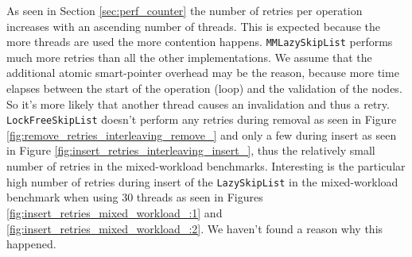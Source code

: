 As seen in Section \ref{sec:perf_counter} the number of retries per operation increases with an ascending number of threads. This is expected because the more threads are used the more contention happens. \texttt{MMLazySkipList} performs much more retries than all the other implementations. We assume that the additional atomic smart-pointer overhead may be the reason, because more time elapses between the start of the operation (loop) and the validation of the nodes. So it's more likely that another thread causes an invalidation and thus a retry. \texttt{LockFreeSkipList} doesn't perform any retries during removal as seen in Figure \ref{fig:remove_retries_interleaving_remove_} and only a few during insert as seen in Figure \ref{fig:insert_retries_interleaving_insert_}, thus the relatively small number of retries in the mixed-workload benchmarks. Interesting is the particular high number of retries during insert of the \texttt{LazySkipList} in the mixed-workload benchmark when using $30$ threads as seen in Figures \ref{fig:insert_retries_mixed_workload_:1} and \ref{fig:insert_retries_mixed_workload_:2}. We haven't found a reason why this happened.
